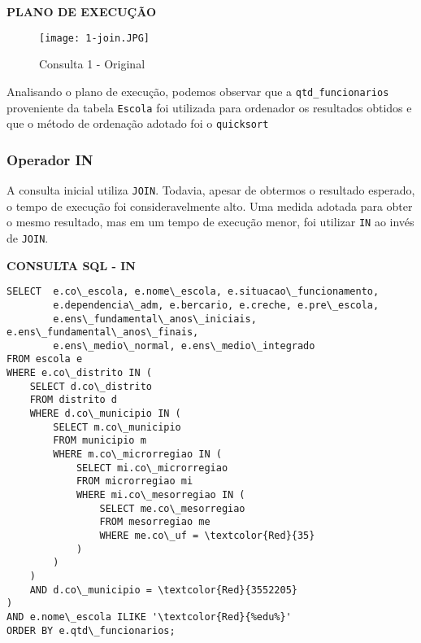 \documentclass[12pt,a4paper]{article}
\begin{document}
\begin{flushleft}
\textbf{PLANO DE EXECUÇÃO}\\
\end{flushleft}

\begin{figure}[H]
    \centering
    \texttt{[image: 1-join.JPG]}
    \caption{Consulta 1 - Original}
    \label{fig:diagrama}
\end{figure}


Analisando o plano de execução, podemos observar que a \texttt{qtd\_funcionarios} proveniente da tabela \texttt{Escola} foi utilizada para ordenador os resultados obtidos e que o método de ordenação adotado foi o \texttt{quicksort} 

\pagebreak

\subsubsection{Operador IN}

A consulta inicial utiliza \texttt{JOIN}. Todavia, apesar de obtermos o resultado esperado, o tempo de execução foi consideravelmente alto. Uma medida adotada para obter o mesmo resultado, mas em um tempo de execução menor, foi utilizar \texttt{IN} ao invés de \texttt{JOIN}. 

\vspace{0.5cm}

\begin{flushleft}
\textbf{CONSULTA SQL - IN}\\
\end{flushleft}

\begin{Verbatim}[commandchars=\\\{\}]
SELECT  e.co\_escola, e.nome\_escola, e.situacao\_funcionamento, 
        e.dependencia\_adm, e.bercario, e.creche, e.pre\_escola,
        e.ens\_fundamental\_anos\_iniciais, e.ens\_fundamental\_anos\_finais,
        e.ens\_medio\_normal, e.ens\_medio\_integrado
FROM escola e
WHERE e.co\_distrito IN (
    SELECT d.co\_distrito
    FROM distrito d
    WHERE d.co\_municipio IN (
        SELECT m.co\_municipio
        FROM municipio m
        WHERE m.co\_microrregiao IN (
            SELECT mi.co\_microrregiao
            FROM microrregiao mi
            WHERE mi.co\_mesorregiao IN (
                SELECT me.co\_mesorregiao
                FROM mesorregiao me
                WHERE me.co\_uf = \textcolor{Red}{35}
            )
        )
    )
    AND d.co\_municipio = \textcolor{Red}{3552205}
)
AND e.nome\_escola ILIKE '\textcolor{Red}{%edu%}'
ORDER BY e.qtd\_funcionarios;
\end{Verbatim}
\end{document}
